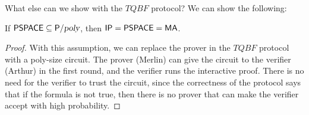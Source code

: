 What else can we show with the $TQBF$ protocol? We can show the following:
\begin{theorem}
If ${\mathsf{PSPACE}} \subseteq {\ensuremath{\mathsf{P}}}/{\textsl{poly}}$, then ${\mathsf{IP}} = {\mathsf{PSPACE}} = {\mathsf{MA}}$.
\end{theorem}
\begin{proof}
With this assumption, we can replace the prover in the $TQBF$ protocol with a poly-size circuit. The prover (Merlin) can give the circuit to the verifier (Arthur) in the first round, and the verifier runs the interactive proof. There is no need for the verifier to trust the circuit, since the correctness of the protocol says that if the formula is not true, then there is no prover that can make the verifier accept with high probability. 
\end{proof}